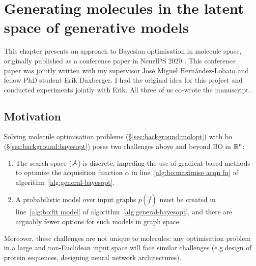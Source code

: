 \chapter{Generating molecules in the latent space of generative models}
\label{chapter:lso}

\ifpdf
    \graphicspath{{chapter0x-LSO/figures}}
\else
    \graphicspath{}
\fi


\newcommand{\codelink}{\url{https://github.com/cambridge-mlg/weighted-retraining}
}
\newcommand{\bestchemscore}{27.84}

This chapter presents an approach
to Bayesian optimisation in molecule space,
originally published as
a conference paper in NeurIPS 2020 \citep{tripp2020sample}.
This conference paper was jointly written with
my supervisor José Miguel Hernández-Lobato
and fellow PhD student Erik Daxberger.
I had the original idea for this project
and conducted experiments jointly with Erik.
All three of us co-wrote the manuscript.

\section{Motivation}
\label{sec:lso:motivation}

Solving molecule optimisation problems (\S\ref{sec:background:molopt})
with \gls{bo} (\S\ref{sec:background:bayesopt}) poses two challenges
above and beyond BO in $\mathbb{R}^n$:

\begin{enumerate}
    \item The search space ($\mathcal{A}$) is discrete,
        impeding the use of gradient-based methods to optimise the acquisition function
        $\alpha$ in line~\ref{alg:bo:maximise acqn fn} of algorithm~\ref{alg:general-bayesopt}.
    \item A probabilistic model over input graphs $p(\hat f)$
        must be created in line~\ref{alg:bo:fit model} of algorithm~\ref{alg:general-bayesopt},
        and there are arguably fewer options for such models in graph space.
\end{enumerate}
Moreover, these challenges are not unique to molecules:
any optimisation problem in a large and non-Euclidean input space will face similar challenges
(e.g.\@ design of protein sequences, designing neural network architectures).

